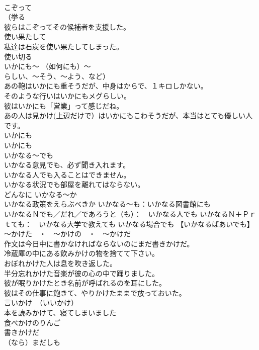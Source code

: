 \documentclass[8pt]{extreport}
\begin{document}
\begin{CJK}{UTF8}{min}
\\	こぞって 
\\	（挙る
\\	彼らはこぞってその候補者を支援した。 
\\	使い果たして 
\\	私達は石炭を使い果たしてしまった。 
\\	使い切る 
\\	いかにも～ （如何にも）～ 
\\	らしい、～そう、～よう、など）	
\\	あの鞄はいかにも重そうだが、中身はからで、１キロしかない。 
\\	そのような行いはいかにもメグらしい。
\\	彼はいかにも「営業」って感じだね。
\\	あの人は見かけ(上辺だけで）はいかにもこわそうだが、本当はとても優しい人です。 
\\	いかにも 
\\	いかにも 
\\	いかなる～でも	
\\	いかなる意見でも、必ず聞き入れます。 
\\	いかなる人でも入ることはできません。 
\\	いかなる状況でも部屋を離れてはならない。
\\	どんなに いかなる～か　
\\	いかなる政策をえらぶべきか いかなる～も：いかなる図書館にも 
\\	いかなるＮでも／だれ／であろうと（も）：　いかなる人でも いかなるＮ＋Ｐｒｔても：　いかなる大学で教えても	いかなる場合でも 【いかなるばあいでも】 
\\	～かけた　・　～かけの　・　～かけだ	
\\	作文は今日中に書かなければならないのにまだ書きかけだ。 
\\	冷蔵庫の中にある飲みかけの物を捨てて下さい。 
\\	おぼれかけた人は息を吹き返した。 
\\	半分忘れかけた音楽が彼の心の中で踊りました。 
\\	彼が眠りかけたとき名前が呼ばれるのを耳にした。 
\\	彼はその仕事に飽きて、やりかけたままで放っておいた。
\\	言いかけ　（いいかけ） 
\\	本を読みかけて、寝てしまいました 
\\	食べかけのりんご 
\\	書きかけだ 
\\	（なら）まだしも 

\end{CJK}
\end{document}
